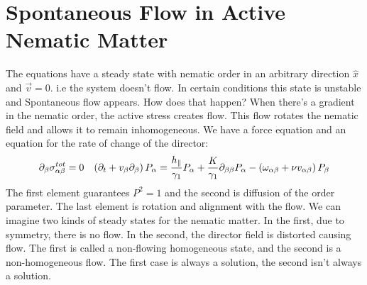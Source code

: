\section{Spontaneous Flow in Active Nematic Matter}
The equations have a steady state with nematic order in an arbitrary direction \(\hat{x}\) and \(\vec{v}=0\). i.e the system doesn't flow. In certain conditions this state is unstable and Spontaneous flow appears. How does that happen? When there's a gradient in the nematic order, the active stress creates flow. This flow rotates the nematic field and allows it to remain inhomogeneous.
We have a force equation and an equation for the rate of change of the director:
\begin{align}
    \partial_\beta\sigma_{\alpha\beta}^{tot} = 0 && \left(\partial_t + v_\beta\partial_\beta\right) P_\alpha = \frac{h_\parallel}{\gamma_1}P_\alpha + \frac{K}{\gamma_1}\partial_{\beta\beta}P_\alpha - \left(\omega_{\alpha\beta}+\nu v_{\alpha\beta}\right)P_\beta
\end{align}
The first element guarantees \(P^2=1\) and the second is diffusion of the order parameter. The last element is rotation and alignment with the flow. We can imagine two kinds of steady states for the nematic matter.
In the first, due to symmetry, there is no flow. In the second, the director field is distorted causing flow. The first is called a non-flowing homogeneous state, and the second is a non-homogeneous flow. The first case is always a solution, the second isn't always a solution.
